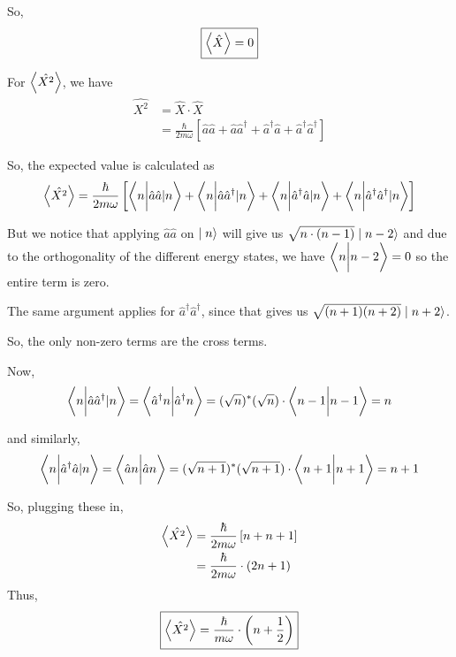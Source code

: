 \documentclass[twoside]{article}
\begin{document}
\begin{enumerate}
   So, 
   \[ \boxed{ \left\langle \hat{X} \right\rangle = 0 } \]


   For $\left\langle \hat{X^2} \right\rangle$, we have
   \begin{align*}
      \hat{X^2} &= \hat{X} \cdot \hat{X} \\
      &= \frac{\hbar}{2m\omega}\left[ \hat{a}\hat{a} + \hat{a}\hat{a}^{\dagger} + \hat{a}^{\dagger}\hat{a} + \hat{a}^{\dagger}\hat{a}^{\dagger} \right]
   \end{align*}

   So, the expected value is calculated as 
   \[ \left\langle \hat{X^2} \right\rangle = \frac{\hbar}{2m\omega} \left[ \left\langle n \bigg\rvert  \hat{a}\hat{a} |n  \right\rangle + \left\langle n \bigg\rvert  \hat{a}\hat{a}^{\dagger} |n  \right\rangle + \left\langle n \bigg\rvert  \hat{a}^{\dagger}\hat{a}|n  \right\rangle + \left\langle n \bigg\rvert \hat{a}^{\dagger}\hat{a}^{\dagger} |n  \right\rangle \right]  \]

   But we notice that applying $\hat{a}\hat{a}$ on $\mid n\rangle$ will give us $\sqrt{n \cdot (n-1)}\mid n-2\rangle$ and due to the orthogonality of the different energy states, we have $\left\langle n \bigg\rvert n-2 \right\rangle = 0$ so the entire term is zero. 

   The same argument applies for $\hat{a}^{\dagger}\hat{a}^{\dagger}$, since that gives us $\sqrt{(n+1)(n+2)} \mid n+2\rangle$. 

   So, the only non-zero terms are the cross terms.


   Now, 
   \[ \left\langle n \bigg\rvert \hat{a}\hat{a}^{\dagger}|n \right\rangle = \left\langle \hat{a}^{\dagger}n \bigg\rvert \hat{a}^{\dagger}n \right\rangle = (\sqrt{n})^{*} (\sqrt{n}) \cdot \left\langle n-1 \bigg\rvert n-1 \right\rangle = n \]

   and similarly, 
   \[ \left\langle n \bigg\rvert \hat{a}^{\dagger}\hat{a}|n \right\rangle = \left\langle \hat{a} n \bigg\rvert \hat{a}n \right\rangle = (\sqrt{n+1})^{*} (\sqrt{n+1}) \cdot \left\langle n+1 \bigg\rvert n+1 \right\rangle = n+1 \]

   So, plugging these in, 
   \begin{align*}
      \left\langle \hat{X^2} \right\rangle &= \frac{\hbar}{2m\omega} \left[ n + n+1 \right] \\
      &= \frac{\hbar}{2m\omega} \cdot (2n+1)
   \end{align*}
   Thus,
   \[ \boxed{\left\langle \hat{X^2} \right\rangle = \frac{\hbar}{m\omega}  \cdot \left(n + \frac{1}{2}\right)} \]
   \vskip 1cm


\end{enumerate}
\end{document}
